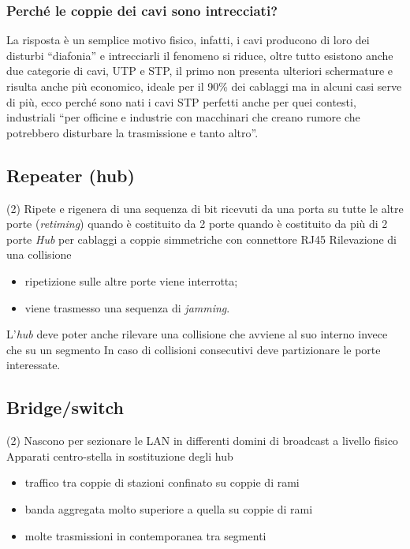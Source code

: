 \documentclass{book}
\begin{document}
\subsubsection{Perché le coppie dei cavi sono intrecciati?}
La risposta è un semplice motivo fisico, infatti, i cavi producono di loro dei
disturbi ``diafonia'' e intrecciarli il fenomeno si riduce, oltre tutto
esistono anche due categorie di cavi, UTP e STP, il primo non presenta
ulteriori schermature e risulta anche più economico, ideale per il 90\% dei
cablaggi ma in alcuni casi serve di più, ecco perché sono nati i cavi STP
perfetti anche per quei contesti, industriali ``per officine e industrie con
macchinari che creano rumore che potrebbero disturbare la trasmissione e tanto
altro''.
\subsection{Repeater (hub)}
\begin{tasks}(2)
	\task Ripete e rigenera di una sequenza di bit ricevuti da una porta su tutte
	le altre porte (\textit{retiming})
	 quando è costituito da 2 porte
	 quando è costituito da più di 2 porte 
	\task \textit{Hub} per cablaggi a coppie simmetriche con connettore RJ45
	\task Rilevazione di una collisione
	\begin{itemize}
		\item ripetizione sulle altre porte viene interrotta;
		\item viene trasmesso una sequenza di \textit{jamming}.
	\end{itemize}
	\task L'\textit{hub} deve poter anche rilevare una collisione che avviene
	al suo interno invece che su un segmento
	\task In caso di collisioni consecutivi deve partizionare le porte
	interessate.
\end{tasks}
\subsection{Bridge/switch}
\begin{tasks}(2)
	\task Nascono per sezionare le LAN in differenti domini di broadcast a
	livello fisico
	\task Apparati centro-stella in sostituzione degli hub
	\begin{itemize}
		\item traffico tra coppie di stazioni confinato su coppie di rami
		\item banda aggregata molto superiore a quella su coppie di rami
		\item molte trasmissioni in contemporanea tra segmenti
	\end{itemize}
\end{tasks}
\end{document}
